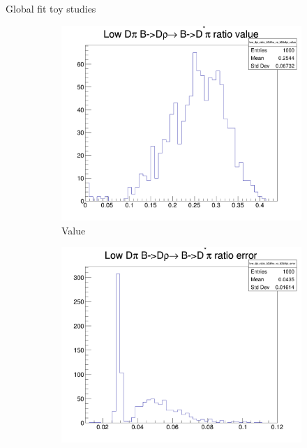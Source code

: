 \documentclass{beamer}
\begin{document}
\begin{frame}{Global fit toy studies}
  \begin{figure}
    \centering
    \vspace{-0.2cm}
    \begin{subfigure}{0.33\textwidth}
      \includegraphics[width = 1.0\textwidth]{Plots/low_dpi_ratio_b2drho_vs_b2dstpi_value.png}
      \caption{Value}
    \end{subfigure}%
    \begin{subfigure}{0.33\textwidth}
      \includegraphics[width = 1.0\textwidth]{Plots/low_dpi_ratio_b2drho_vs_b2dstpi_error.png}

\end{subfigure}
\end{figure}
\end{frame}
\end{document}
